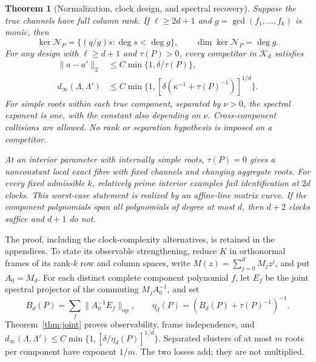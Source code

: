 \documentclass[11pt,reqno]{amsart}
\numberwithin{equation}{section}
\newtheorem{theorem}{Theorem}[section]
\theoremstyle{definition}\newtheorem{definition}[theorem]{Definition}
\theoremstyle{remark}\newtheorem{remark}[theorem]{Remark}
\newcommand{\op}{\mathrm{op}}
\newcommand{\cK}{\mathcal K}
\newcommand{\cN}{\mathcal N}
\begin{document}
\begin{theorem}[Normalization, clock design, and spectral recovery]
\label{thm:main}
Suppose the true channels have full column rank. If $\ell\ge2d+1$
and $g=\gcd(f_1,\ldots,f_k)$ is monic, then
\begin{equation}\label{eq:kernel}
 \ker\cN_P=\{(q/g)s:\deg s<\deg g\},\qquad
 \dim\ker\cN_P=\deg g.
\end{equation}
For any design with $\ell\ge d+1$ and $\tau(P)>0$, every competitor
in $\cK_d$ satisfies
\begin{align}
 \|a-a'\|_2&\le C\min\{1,\delta/\tau(P)\},\label{eq:q-bound}\\
 d_\infty(\Lambda,\Lambda')&\le
 C\min\{1,[\delta(\kappa^{-1}+\tau(P)^{-1})]^{1/d}\}.
 \label{eq:poly-bound}
\end{align}
For simple roots within each true component, separated by $\nu>0$,
the spectral exponent is one, with the constant also depending on
$\nu$. Cross-component collisions are allowed. No rank or separation
hypothesis is imposed on a competitor.

At an interior parameter with internally simple roots, $\tau(P)=0$
gives a nonconstant local exact fibre with fixed channels and changing
aggregate roots. For every fixed admissible $k$, relatively prime
interior examples fail identification at $2d$ clocks. This worst-case
statement is realized by an affine-line matrix curve. If the component
polynomials span all polynomials of degree at most $d$, then $d+2$
clocks suffice and $d+1$ do not.
\end{theorem}
The proof, including the clock-complexity alternatives, is retained
in the appendices. To state its observable strengthening, reduce
$K$ in orthonormal frames of its rank-$k$ row and column spaces,
write $M(z)=\sum_{j=0}^dM_jz^j$, and put $A_0=M_d$.
For each distinct complete component polynomial $f$, let $E_f$ be
the joint spectral projector of the commuting $M_jA_0^{-1}$, and set
\[
 B_d(P)=\sum_f\|A_0^{-1}E_f\|_\op,
 \qquad \eta_d(P)=(B_d(P)+\tau(P)^{-1})^{-1}.
\]
Theorem~\ref{thm:joint} proves observability, frame independence, and
$d_\infty(\Lambda,\Lambda')\le
C\min\{1,[\delta/\eta_d(P)]^{1/d}\}$.
Separated clusters of at most $m$ roots per component have exponent
$1/m$. The two losses add; they are not multiplied.
\end{document}
